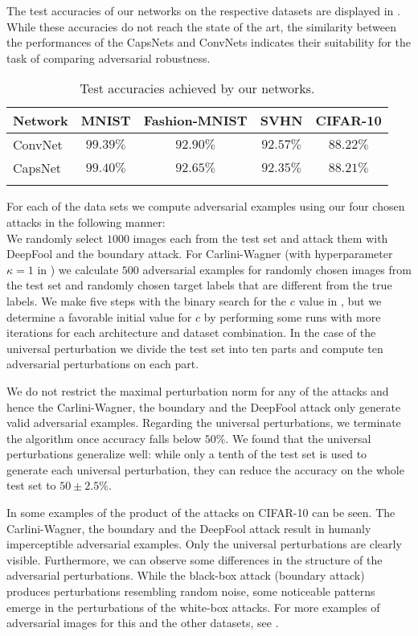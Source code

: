 The test accuracies of our networks on the respective datasets are displayed in .
While these accuracies do not reach the state of the art, the similarity between the performances of the CapsNets and ConvNets indicates their suitability for the task of comparing adversarial robustness.

\begin{table}	
	\centering
	\begin{tabular}{lcccc}
		\toprule
		Network       & MNIST & Fashion-MNIST & SVHN & CIFAR-10  \\
		\midrule
		ConvNet           & $99.39\%$ & $92.90\%$ & $92.57\%$ & $88.22\%$ \\
		CapsNet           & $99.40\%$ & $92.65\%$ & $92.35\%$ & $88.21\%$ \\
		\bottomrule\\
	\end{tabular}
	\caption[Test accuracies]{Test accuracies achieved by our networks.}
	\label{tab:accuracies}
\end{table}

For each of the data sets we compute adversarial examples using our four chosen attacks in the following manner:\\
We randomly select $1000$ images each from the test set and attack them with DeepFool and the boundary attack.
For Carlini-Wagner (with hyperparameter $\kappa=1$ in ) we calculate $500$ adversarial examples for randomly chosen images from the test set and randomly chosen target labels that are different from the true labels.
We make five steps with the binary search for the $c$ value in , but we determine a favorable initial value for $c$ by performing some runs with more iterations for each architecture and dataset combination.
In the case of the universal perturbation we divide the test set into ten parts and compute ten adversarial perturbations on each part.

We do not restrict the maximal perturbation norm for any of the attacks and hence the Carlini-Wagner, the boundary and the DeepFool attack only generate valid adversarial examples.
Regarding the universal perturbations, we terminate the algorithm once accuracy falls below $50\%$.
We found that the universal perturbations generalize well: while only a tenth of the test set is used to generate each universal perturbation, they can reduce the accuracy on the whole test set to $50\pm2.5\%$.

In  some examples of the product of the attacks on CIFAR-10 can be seen.
The Carlini-Wagner, the boundary and the DeepFool attack result in humanly imperceptible adversarial examples.
Only the universal perturbations are clearly visible.
Furthermore, we can observe some differences in the structure of the adversarial perturbations.
While the black-box attack (boundary attack) produces perturbations resembling random noise, some noticeable patterns emerge in the perturbations of the white-box attacks.
For more examples of adversarial images for this and the other datasets, see .

